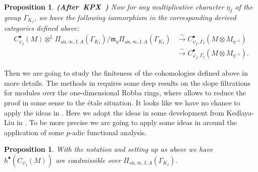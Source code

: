 \documentclass[12pt]{amsart}
\newtheorem{proposition}[theorem]{Proposition}
\theoremstyle{definition}
\numberwithin{equation}{section}
\begin{document}
\begin{proposition} \mbox{\bf{(After KPX \cite[Proposition 4.2.3]{KPX})}} \label{proposition4.4}
Now for any multiplicative character $\eta_I$ of the group $\Gamma_{K_I}$, we have the following isomorphism in the corresponding derived categories defined above:
\begin{align}
C^\bullet_{\psi_I}(M)\otimes^{\mathbb{L}}\Pi_{\mathrm{an},\infty,I,A}(\Gamma_{K_I})/\mathfrak{m}_\eta \Pi_{\mathrm{an},\infty,I,A}(\Gamma_{K_I})&\overset{\sim}{\longrightarrow} C^\bullet_{\psi_I,\Gamma_I}(M\otimes M_{\eta^{-1}})\\
	&\overset{\sim}{\longrightarrow}C^\bullet_{\varphi_I,\Gamma_I}(M\otimes M_{\eta^{-1}}).
\end{align}	
\end{proposition}



\indent Then we are going to study the finiteness of the cohomologies defined above in more details. The methods in \cite{KPX} requires some deep results on the slope filtrations for modules over the one-dimensional Robba rings, where allows \cite{KPX} to reduce the proof in some sense to the \'etale situation. It looks like we have no chance to apply the ideas in \cite{KPX}. Here we adopt the ideas in some development from Kedlaya-Liu in \cite{KL3}. To be more precise we are going to apply some ideas in \cite{KL3} around the application of some $p$-adic functional analysis. 







\begin{proposition} \label{proposition4.7}
With the notation and setting up as above we have $h^\bullet(C_{\psi_I}(M))$ are coadmissible over $\Pi_{\mathrm{an},\infty,I,A}(\Gamma_{K_I})$.	
\end{proposition}
\end{document}
